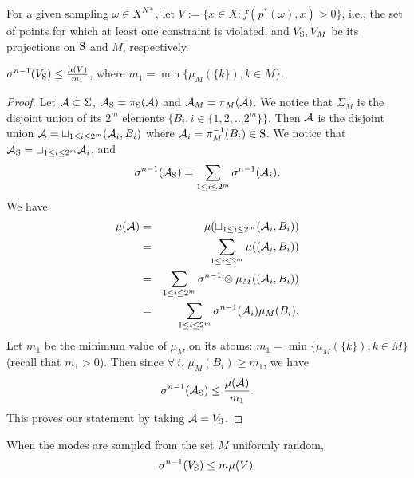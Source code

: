 
For a given sampling $\omega \in X^{N*}$, let $V:=\{x \in X: f(p^*(\omega),x) > 0\}$, i.e., the set of points for which at least one constraint is violated, and $V_{\text{S}}, V_M$ be its projections on $\text{S}$ and $M$, respectively. 

\begin{lemma}$\sigma^{n-1}(V_{\text{S}}) \leq \frac{\mu(V)}{m_1}$, where $m_1 = \min \{\mu_M(\{k\}), k \in M\}$.\end{lemma}
\begin{proof}

Let $\mathcal{A} \subset \Sigma$, $\mathcal{A}_{\text{S}} = \pi_{\text{S}} (\mathcal{A})$ and $\mathcal{A}_M = \pi_M (\mathcal{A})$. We notice that $\Sigma_M$ is the disjoint union of its $2^m$ elements $\{B_i, i \in \{1,2, \ldots 2^m\} \}$. Then $\mathcal{A}$ is the disjoint union $\mathcal{A} = \sqcup_{1 \leq i \leq 2^m} (\mathcal{A}_i, B_i)$ where $\mathcal{A}_i = \pi_M^{-1} (B_i) \in \text{S}$. We notice that 
$\mathcal{A}_{\text{S}} = \sqcup_{1 \leq i \leq 2^m} \mathcal{A}_i$, 
and
\begin{equation*}
\sigma^{n-1} (\mathcal{A}_{\text{S}}) = \sum_{1 \leq i \leq 2^m} \sigma^{n-1} (\mathcal{A}_i).
\end{equation*}
We have 
\begin{eqnarray*}
\mu(\mathcal{A}) &=& \mu(\sqcup_{1 \leq i \leq 2^m} (\mathcal{A}_i, B_i)) \\
&=& \sum_{1 \leq i \leq 2^m} \mu( (\mathcal{A}_i, B_i)) \\
 &=& \sum_{1 \leq i \leq 2^m} \sigma^{n-1} \otimes \mu_M ((\mathcal{A}_i, B_i)) \\
 & = &\sum_{1 \leq i \leq 2^m} \sigma^{n-1}(\mathcal{A}_i) \mu_M (B_i).
\end{eqnarray*}
Let $m_1$ be the minimum value  of $\mu_M$ on its atoms: $m_1 = \min \{\mu_M(\{k\}), k \in M\}$ (recall that $m_1 > 0$). Then since $ \forall \ i$, $\mu_M(B_i) \geq m_1$, we have
\begin{equation}
\sigma^{n-1}(\mathcal{A}_{\text{S}}) \leq \frac{\mu(\mathcal{A})}{m_1}.
\end{equation}
This proves our statement by taking $\mathcal{A} = V_{\text{S}}$.
\end{proof}

\begin{corollary} \label{cor:measure}When the modes are sampled from the set $M$ uniformly random, 
\begin{equation*}\sigma^{n-1}(V_{\text{S}}) \leq m \mu(V). \end{equation*}
\end{corollary}

